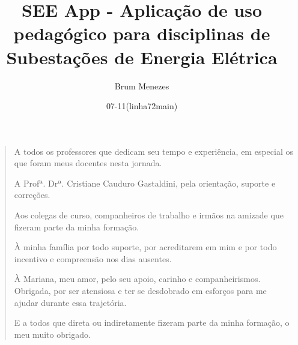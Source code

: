 \documentclass[tg]{mdtufsm}
\title{SEE App - Aplicação de uso pedagógico para disciplinas de Subestações de Energia Elétrica}
\author{Brum Menezes}{Laís}
\institute{Campus Cachoeira do Sul}
\date{07-11(linha72main)}{Fevereiro}{2022}
\begin{document}
\maketitle

\restoregeometry


\makeapprove

\clearpage
\begin{quote}
\mbox{}
{\sffamily\itshape \vspace*{7cm}

A todos os professores que dedicam seu tempo e experiência, em especial os que foram meus docentes nesta jornada.

A Profª. Drª. Cristiane Cauduro Gastaldini, pela orientação, suporte e correções.

Aos colegas de curso, companheiros de trabalho e irmãos na amizade que fizeram parte da minha formação.

À minha família por todo suporte, por acreditarem em mim e por todo incentivo e
compreensão nos dias ausentes.

À Mariana, meu amor, pelo seu apoio, carinho e companheirismos. Obrigada, por ser atensiosa e ter se desdobrado em esforços para me ajudar durante essa trajetória.

E a todos que direta ou indiretamente fizeram parte da minha formação, o meu muito
obrigado.}
\end{quote}

\end{document}
